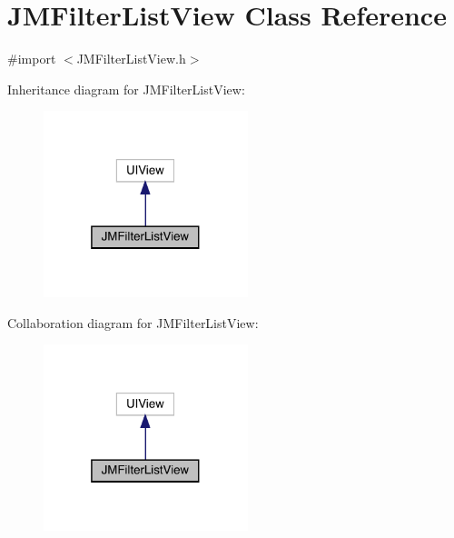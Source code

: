 \hypertarget{interface_j_m_filter_list_view}{}\section{J\+M\+Filter\+List\+View Class Reference}
\label{interface_j_m_filter_list_view}


{\ttfamily \#import $<$J\+M\+Filter\+List\+View.\+h$>$}



Inheritance diagram for J\+M\+Filter\+List\+View\+:\nopagebreak
\begin{figure}[H]
\begin{center}
\leavevmode
\includegraphics[width=169pt]{interface_j_m_filter_list_view__inherit__graph}
\end{center}
\end{figure}


Collaboration diagram for J\+M\+Filter\+List\+View\+:\nopagebreak
\begin{figure}[H]
\begin{center}
\leavevmode
\includegraphics[width=169pt]{interface_j_m_filter_list_view__coll__graph}
\end{center}
\end{figure}
